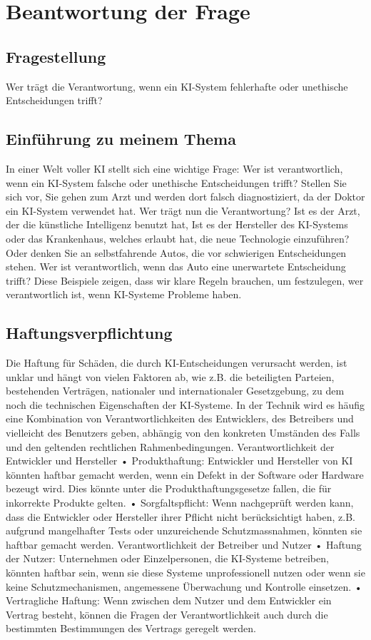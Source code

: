 \documentclass{report}
\begin{document}
\chapter{Beantwortung der Frage}

\section {Fragestellung}
Wer trägt die Verantwortung, wenn ein KI-System fehlerhafte oder unethische Entscheidungen trifft?

\section {Einführung zu meinem Thema}
In einer Welt voller KI stellt sich eine wichtige Frage: Wer ist verantwortlich, 
wenn ein KI-System falsche oder unethische Entscheidungen trifft? 
Stellen Sie sich vor, Sie gehen zum Arzt und werden dort falsch diagnostiziert, da der Doktor ein KI-System verwendet hat. Wer trägt nun die Verantwortung? Ist es der Arzt, der die künstliche Intelligenz benutzt hat, Ist es der Hersteller des KI-Systems oder das Krankenhaus, welches erlaubt hat, die neue Technologie einzuführen?
Oder denken Sie an selbstfahrende Autos, die vor schwierigen Entscheidungen stehen. Wer ist verantwortlich, wenn das Auto eine unerwartete Entscheidung trifft? Diese Beispiele zeigen, dass wir klare Regeln brauchen, um festzulegen, wer verantwortlich ist, wenn KI-Systeme Probleme haben. 

\section{Haftungsverpflichtung}
Die Haftung für Schäden, die durch KI-Entscheidungen verursacht werden, ist unklar und hängt von vielen Faktoren ab, wie z.B. die beteiligten Parteien, bestehenden Verträgen, nationaler und internationaler Gesetzgebung, zu dem noch die technischen Eigenschaften der KI-Systeme. In der Technik wird es häufig eine Kombination von Verantwortlichkeiten des Entwicklers, des Betreibers und vielleicht des Benutzers geben, abhängig von den konkreten Umständen des Falls und den geltenden rechtlichen Rahmenbedingungen.
Verantwortlichkeit der Entwickler und Hersteller
•	Produkthaftung: Entwickler und Hersteller von KI könnten haftbar gemacht werden, wenn ein Defekt in der Software oder Hardware bezeugt wird. Dies könnte unter die Produkthaftungsgesetze fallen, die für inkorrekte Produkte gelten.
•	Sorgfaltspflicht: Wenn nachgeprüft werden kann, dass die Entwickler oder Hersteller ihrer Pflicht nicht berücksichtigt haben, z.B. aufgrund mangelhafter Tests oder unzureichende Schutzmassnahmen, könnten sie haftbar gemacht werden.
Verantwortlichkeit der Betreiber und Nutzer 
•	Haftung der Nutzer: Unternehmen oder Einzelpersonen, die KI-Systeme betreiben, könnten haftbar sein, wenn sie diese Systeme unprofessionell nutzen oder wenn sie keine Schutzmechanismen, angemessene Überwachung und Kontrolle einsetzen. 
•	Vertragliche Haftung: Wenn zwischen dem Nutzer und dem Entwickler ein Vertrag besteht, können die Fragen der Verantwortlichkeit auch durch die bestimmten Bestimmungen des Vertrags geregelt werden.
\end{document}
